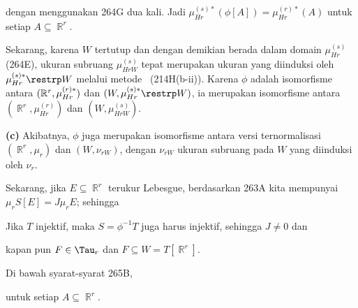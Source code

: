 {

\noindent dengan menggunakan 264G dua kali. Jadi
$\mu_{Hr}^{(s)*}(\phi[A])=\mu_{Hr}^{(r)*}(A)$ untuk setiap
$A\subseteq \BbbR^r$.

\medskip

 Sekarang, karena $W$ tertutup dan dengan demikian
berada dalam domain $\mu_{Hr}^{(s)}$ (264E), ukuran subruang
$\mu_{HrW}^{(s)}$ tepat merupakan ukuran yang diinduksi oleh
$\mu_{Hr}^{(s)*}\restrp W$ melalui metode \Caratheodory\
(214H(b-ii)). Karena $\phi$ adalah isomorfisme antara
$(\Bbb R^r,\mu_{Hr}^{(r)*})$ dan
$(W,\mu_{Hr}^{(s)*}\restrp W)$, ia merupakan isomorfisme antara
$(\BbbR^r,\mu_{Hr}^{(r)})$ dan $(W,\mu_{HrW}^{(s)})$.
\Qed

\medskip

{\bf (c)} Akibatnya, $\phi$ juga merupakan isomorfisme antara versi
ternormalisasi $(\BbbR^r,\mu_r)$ dan $(W,\nu_{rW})$, dengan
$\nu_{rW}$ ukuran subruang pada $W$ yang diinduksi oleh $\nu_r$.

Sekarang, jika $E\subseteq\BbbR^r$ terukur Lebesgue, berdasarkan
263A kita mempunyai $\mu_rS[E]=J\mu_rE$; sehingga

\Centerline{$\nu_rT[E]=\nu_r(P\trs R\trs [S[E]])=\nu_r(\phi[S[E]])
=\mu_rS[E]=J\mu_rE$.}

\noindent Jika $T$ injektif, maka $S=\phi^{-1}T$ juga harus injektif,
sehingga $J\ne 0$ dan


\noindent kapan pun $F\in\Tau_r$ dan $F\subseteq W=T[\BbbR^r]$.
}%

 Di bawah syarat-syarat 265B,


\noindent untuk setiap $A\subseteq\BbbR^r$.


